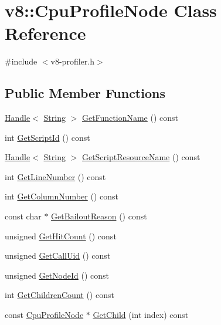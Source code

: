 \hypertarget{classv8_1_1_cpu_profile_node}{}\section{v8\+:\+:Cpu\+Profile\+Node Class Reference}
\label{classv8_1_1_cpu_profile_node}


{\ttfamily \#include $<$v8-\/profiler.\+h$>$}

\subsection*{Public Member Functions}
\begin{DoxyCompactItemize}
\item 
\hyperlink{classv8_1_1_handle}{Handle}$<$ \hyperlink{classv8_1_1_string}{String} $>$ \hyperlink{classv8_1_1_cpu_profile_node_affbc7842b66986012285602ab65aa5f8}{Get\+Function\+Name} () const 
\item 
int \hyperlink{classv8_1_1_cpu_profile_node_acf6f384df08ec40ff306d3e229f77258}{Get\+Script\+Id} () const 
\item 
\hyperlink{classv8_1_1_handle}{Handle}$<$ \hyperlink{classv8_1_1_string}{String} $>$ \hyperlink{classv8_1_1_cpu_profile_node_a140dd536e7096701a36be0083c18c268}{Get\+Script\+Resource\+Name} () const 
\item 
int \hyperlink{classv8_1_1_cpu_profile_node_a45ea035661c7152e4f3eb47f73787a75}{Get\+Line\+Number} () const 
\item 
int \hyperlink{classv8_1_1_cpu_profile_node_a43cf237ea6f254a61a6e2a81d554aa1a}{Get\+Column\+Number} () const 
\item 
const char $\ast$ \hyperlink{classv8_1_1_cpu_profile_node_a16cd3d8d7ef307784838a35022507031}{Get\+Bailout\+Reason} () const 
\item 
unsigned \hyperlink{classv8_1_1_cpu_profile_node_a8d297f185b0bbd9f6853f6ed193b656e}{Get\+Hit\+Count} () const 
\item 
unsigned \hyperlink{classv8_1_1_cpu_profile_node_a245092eb223b948fc9441664d9e2701e}{Get\+Call\+Uid} () const 
\item 
unsigned \hyperlink{classv8_1_1_cpu_profile_node_ae2971c5003353a984ef72b6cddf5e298}{Get\+Node\+Id} () const 
\item 
int \hyperlink{classv8_1_1_cpu_profile_node_ac4612b91e43a2901ac20c3705288955b}{Get\+Children\+Count} () const 
\item 
const \hyperlink{classv8_1_1_cpu_profile_node}{Cpu\+Profile\+Node} $\ast$ \hyperlink{classv8_1_1_cpu_profile_node_aa397db1e0f5147155164c5ea3e854d69}{Get\+Child} (int index) const 
\end{DoxyCompactItemize}
